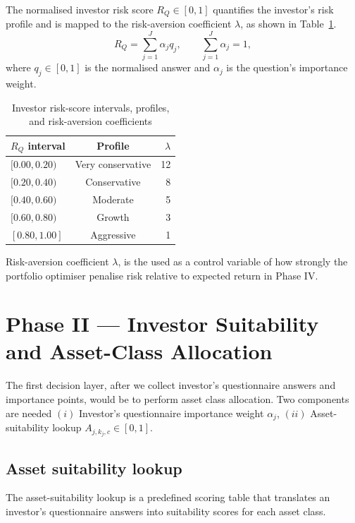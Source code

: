 \documentclass[11pt,a4paper]{article}
\begin{document}
The normalised investor risk score $R_Q\in[0,1]$ quantifies the investor's risk profile and is mapped to the risk-aversion coefficient $\lambda$, as shown in Table~\ref{tab:risk-profile-lambda}.
\begin{equation}
  R_Q=\sum_{j=1}^{J}\alpha_jq_j,
  \qquad
  \sum_{j=1}^{J}\alpha_j=1,
\end{equation}
where $q_j\in[0,1]$ is the normalised answer and $\alpha_j$ is the question's importance weight.

\begin{table}[H]
  \centering
  \caption{Investor risk-score intervals, profiles, and risk-aversion coefficients}
  \label{tab:risk-profile-lambda}
  \begin{tabular}{lcr}
    \toprule
    $R_Q$ interval & Profile & $\lambda$ \\
    \midrule
    $[0.00, 0.20)$ & Very conservative & 12 \\
    $[0.20, 0.40)$ & Conservative & 8 \\
    $[0.40, 0.60)$ & Moderate & 5 \\
    $[0.60, 0.80)$ & Growth & 3 \\
    $[0.80, 1.00]$ & Aggressive & 1 \\
    \bottomrule
  \end{tabular}
\end{table}

Risk-aversion coefficient $\lambda$, is the used as a control variable of how strongly the portfolio optimiser penalise risk relative to expected return in Phase IV.

\section{Phase II --- Investor Suitability and Asset-Class Allocation}
\label{sec:phase-two}

The first decision layer, after we collect investor's questionnaire answers and importance points, would be to perform asset class allocation.
Two components are needed $(i)$ Investor's questionnaire importance weight $\alpha_j$, $(ii)$ Asset-suitability lookup $A_{j,k_j,c}\in[0,1]$.

\subsection{Asset suitability lookup}

The asset-suitability lookup is a predefined scoring table that translates an investor's questionnaire answers into suitability scores for each asset class.
\end{document}

